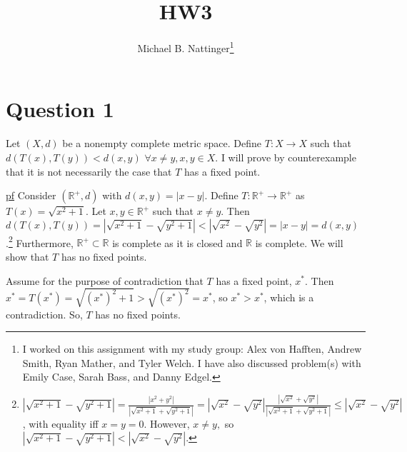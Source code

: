 \documentclass[11pt]{article} %
\title{HW3}
\author{Michael B. Nattinger\footnote{I worked on this assignment with my study group: Alex von Hafften, Andrew Smith, Ryan Mather, and Tyler Welch. I have also discussed problem(s) with Emily Case, Sarah Bass, and Danny Edgel.}}
\begin{document}
\maketitle

\section{Question 1}
Let $(X, d)$ be a nonempty complete metric space. Define $T: X \rightarrow X$ such that $d(T(x),T(y))<d(x,y)$ $\forall x \neq y, x,y \in X.$ I will prove by counterexample that it is not necessarily the case that $T$ has a fixed point.

\underline{pf} Consider $(\mathbb{R}^{+},d)$ with $d(x,y) = |x-y|$. Define $T: \mathbb{R}^{+} \rightarrow \mathbb{R}^{+}$ as $T(x) = \sqrt{x^2 + 1}$. Let $x,y \in \mathbb{R}^{+}$ such that $x \neq y$. Then $d(T(x),T(y)) = |\sqrt{x^2 + 1} - \sqrt{y^2 +1}| < |\sqrt{x^2} - \sqrt{y^2}| = |x - y| = d(x,y)$.\footnote{ $ |\sqrt{x^2 + 1} - \sqrt{y^2 +1}| = \frac{|x^2 + y^2|}{|\sqrt{x^2 + 1} + \sqrt{y^2 +1}|}  = |\sqrt{x^2} - \sqrt{y^2}| \frac{|\sqrt{x^2} + \sqrt{y^2}|}{|\sqrt{x^2 + 1} + \sqrt{y^2 + 1}|} \leq |\sqrt{x^2} - \sqrt{y^2}|$, with equality iff $x=y=0.$ However, $x \neq y,$ so $|\sqrt{x^2 + 1} - \sqrt{y^2 +1}| < |\sqrt{x^2} - \sqrt{y^2}|$. } Furthermore, $\mathbb{R}^{+} \subset \mathbb{R}$ is complete as it is closed and $\mathbb{R}$ is complete. We will show that $T$ has no fixed points.

Assume for the purpose of contradiction that $T$ has a fixed point, $x^*$. Then $x^* = T(x^*) = \sqrt{(x^*)^2 + 1} > \sqrt{(x^*)^2} = x^*$, so $x^* > x^*$, which is a contradiction. So, $T$ has no fixed points.

%
\end{document}
